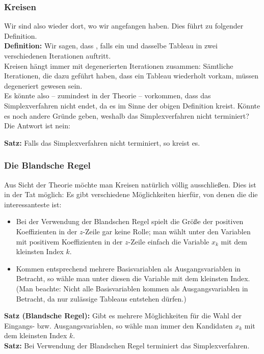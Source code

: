 \documentclass[smaller]{beamer}
\begin{document}
\begin{frame}
 \frametitle{Kreisen}
 \alert{Wir sind also wieder dort, wo wir angefangen haben}. Dies führt zu folgender Definition.\\
 \vspace*{0.2cm}
\textbf{Definition:}
Wir sagen, dass , falls ein und dasselbe Tableau in zwei verschiedenen Iterationen auftritt.\\
\vspace*{0.2cm}
Kreisen hängt immer mit degenerierten Iterationen zusammen: \alert{Sämtliche Iterationen, die dazu geführt haben, dass ein Tableau wiederholt vorkam, müssen degeneriert gewesen sein}.\\
\vspace*{0.2cm}
Es könnte also -- zumindest in der Theorie -- vorkommen, dass das Simplexverfahren nicht endet, da es im Sinne der obigen Definition kreist. Könnte es noch andere Gründe geben, weshalb das Simplexverfahren nicht terminiert? Die Antwort ist \alert{nein}: \\\vspace*{0.2cm}

\textbf{Satz:}
Falls das Simplexverfahren nicht terminiert, so kreist es.
\end{frame}

\begin{frame}
 \frametitle{Die Blandsche Regel}
 Aus Sicht der Theorie möchte man Kreisen natürlich völlig ausschließen. Dies ist in der Tat möglich: Es gibt verschiedene Möglichkeiten hierfür, von denen die   die interessanteste ist:
 \begin{itemize}
 \item Bei der Verwendung der Blandschen Regel spielt die Größe der positiven Koeffizienten in der $z$-Zeile gar keine Rolle; \alert{man wählt unter den Variablen mit positivem Koeffizienten in der $z$-Zeile einfach die Variable $x_k$ mit dem kleinsten Index $k$.}
 \item Kommen entsprechend mehrere Basisvariablen als Ausgangsvariablen in Betracht, \alert{so wähle man unter diesen die Variable mit dem kleinsten Index.} (Man beachte: Nicht alle Basisvariablen kommen als Ausgangsvariablen in Betracht, da nur zulässige Tableaus entstehen dürfen.)
 \end{itemize}
 \textbf{Satz (Blandsche Regel):}
Gibt es mehrere Möglichkeiten für die Wahl der Eingangs- bzw. Ausgangsvariablen, so wähle man immer den Kandidaten $x_k$ mit dem kleinsten Index $k$. \\ \vspace*{0.2cm}
 \textbf{Satz:}
Bei Verwendung der Blandschen Regel terminiert das Simplexverfahren.
\end{frame}
\end{document}
